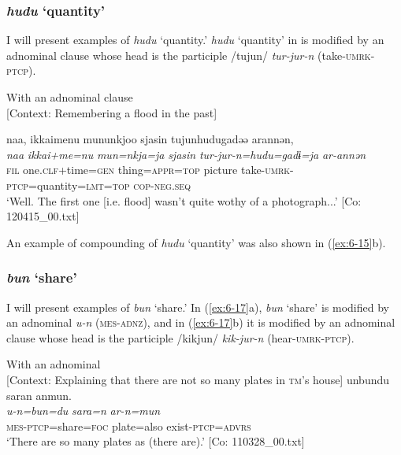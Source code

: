 \subsubsection{\textit{hudu} ‘quantity’}

I will present examples of \textit{hudu} ‘quantity.’ \textit{hudu} ‘quantity’ in  is modified by an adnominal clause whose head is the participle /tujun/ \textit{tur-jur-n} (take-\textsc{umrk}-\textsc{ptcp}).

\ea\label{ex:6-16}
 With an adnominal clause\\{}
[Context: Remembering a flood in the past]

{\TM}
\glll naa,  {\textbar}ikkaime{\textbar}nu  mununkjoo  sjasin    tujunhudugadəə  arannən,\\
\textit{naa}  \textit{ikkai+me=nu}  \textit{mun=nkja=ja}  \textit{sjasin} \textit{tur-jur-n=hudu=gadɨ=ja}  \textit{ar-annən}\\
    \textsc{fil}  one.\textsc{clf}+time=\textsc{gen}  thing=\textsc{appr}=\textsc{top}  picture   take-\textsc{umrk}-\textsc{ptcp}=quantity=\textsc{lmt}=\textsc{top}  \textsc{cop}-\textsc{neg}.\textsc{seq}\\
\glt    ‘Well. The first one [i.e. flood] wasn’t quite wothy of a photograph...’ [Co: 120415\_00.txt]
\z

An example of compounding of \textit{hudu} ‘quantity’ was also shown in (\ref{ex:6-15}b).

\subsubsection{\textit{bun} ‘share’}

I will present examples of \textit{bun} ‘share.’ In (\ref{ex:6-17}a), \textit{bun} ‘share’ is modified by an adnominal \textit{u-n} (\textsc{mes}-\textsc{adnz}), and in (\ref{ex:6-17}b) it is modified by an adnominal clause whose head is the participle /kikjun/ \textit{kik-jur-n} (hear-\textsc{umrk}-\textsc{ptcp}).

\ea\label{ex:6-17}
\ea With an adnominal\\{}
[Context: Explaining that there are not so many plates in \textsc{tm}’s house]
{\TM}
\glll unbundu  saran  anmun.\\
      \textit{u-n=bun=du}  \textit{sara=n}  \textit{ar-n=mun}\\
      \textsc{mes}-\textsc{ptcp}=share=\textsc{foc}  plate=also  exist-\textsc{ptcp}=\textsc{advrs}\\
\glt ‘There are so many plates as (there are).’ [Co: 110328\_00.txt]

